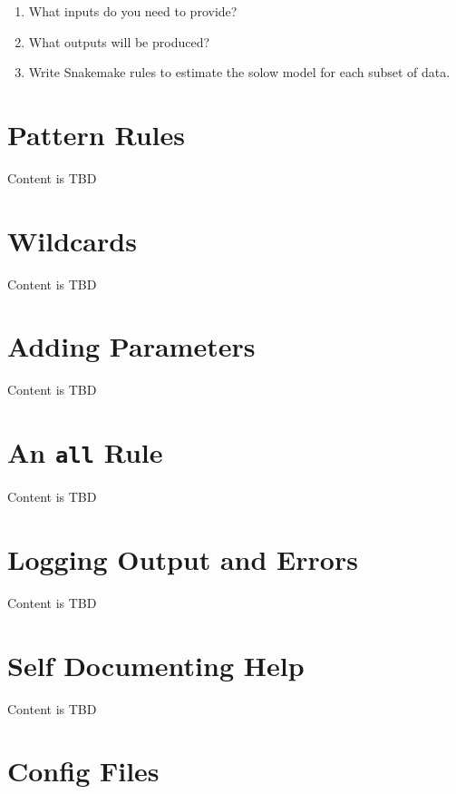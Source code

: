 \documentclass[]{book}
\providecommand{\tightlist}{%
  \setlength{\itemsep}{0pt}\setlength{\parskip}{0pt}}
\theoremstyle{definition}
\theoremstyle{definition}
\theoremstyle{definition}
\theoremstyle{remark}
\begin{document}
\begin{enumerate}
\def\labelenumi{\arabic{enumi}.}
\tightlist
\item
  What inputs do you need to provide?
\item
  What outputs will be produced?
\item
  Write Snakemake rules to estimate the solow model for each subset of
  data.
\end{enumerate}

\chapter{Pattern Rules}\label{pattern-rules}

Content is TBD

\chapter{Wildcards}\label{wildcards}

Content is TBD

\chapter{Adding Parameters}\label{adding-parameters}

Content is TBD

\chapter{\texorpdfstring{An \texttt{all}
Rule}{An all Rule}}\label{an-all-rule}

Content is TBD

\chapter{Logging Output and Errors}\label{logging-output-and-errors}

Content is TBD

\chapter{Self Documenting Help}\label{self-documenting-help}

Content is TBD

\chapter{Config Files}\label{config-files}
\end{document}
